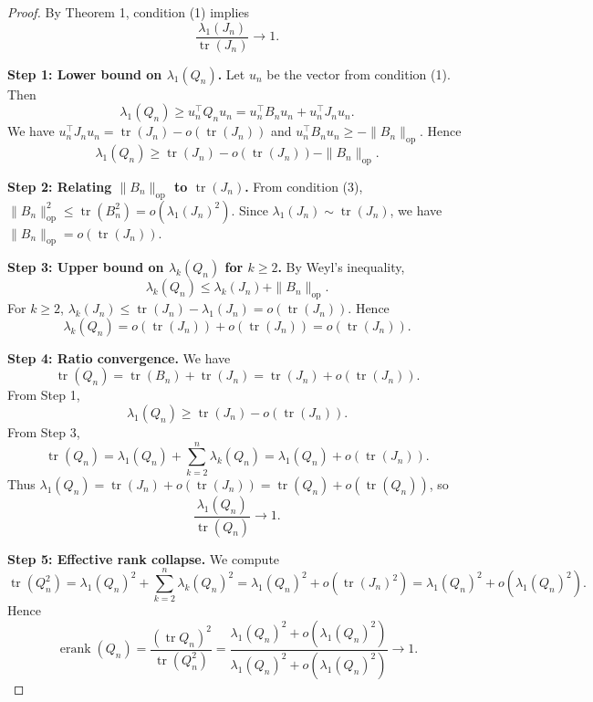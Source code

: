\documentclass{article}
\begin{document}
\begin{proof}
By Theorem 1, condition (1) implies
\[
\frac{\lambda_1(J_n)}{\operatorname{tr}(J_n)} \to 1.
\]

\textbf{Step 1: Lower bound on \(\lambda_1(Q_n)\).}
Let \(u_n\) be the vector from condition (1). Then
\[
\lambda_1(Q_n) \ge u_n^\top Q_n u_n = u_n^\top B_n u_n + u_n^\top J_n u_n.
\]
We have \(u_n^\top J_n u_n = \operatorname{tr}(J_n) - o(\operatorname{tr}(J_n))\) and \(u_n^\top B_n u_n \ge -\|B_n\|_{\mathrm{op}}\). Hence
\[
\lambda_1(Q_n) \ge \operatorname{tr}(J_n) - o(\operatorname{tr}(J_n)) - \|B_n\|_{\mathrm{op}}.
\]

\textbf{Step 2: Relating \(\|B_n\|_{\mathrm{op}}\) to \(\operatorname{tr}(J_n)\).}
From condition (3), \(\|B_n\|_{\mathrm{op}}^2 \le \operatorname{tr}(B_n^2) = o(\lambda_1(J_n)^2)\). Since \(\lambda_1(J_n) \sim \operatorname{tr}(J_n)\), we have \(\|B_n\|_{\mathrm{op}} = o(\operatorname{tr}(J_n))\).

\textbf{Step 3: Upper bound on \(\lambda_k(Q_n)\) for \(k \ge 2\).}
By Weyl's inequality,
\[
\lambda_k(Q_n) \le \lambda_k(J_n) + \|B_n\|_{\mathrm{op}}.
\]
For \(k \ge 2\), \(\lambda_k(J_n) \le \operatorname{tr}(J_n) - \lambda_1(J_n) = o(\operatorname{tr}(J_n))\). Hence
\[
\lambda_k(Q_n) = o(\operatorname{tr}(J_n)) + o(\operatorname{tr}(J_n)) = o(\operatorname{tr}(J_n)).
\]

\textbf{Step 4: Ratio convergence.}
We have
\[
\operatorname{tr}(Q_n) = \operatorname{tr}(B_n) + \operatorname{tr}(J_n) = \operatorname{tr}(J_n) + o(\operatorname{tr}(J_n)).
\]
From Step 1,
\[
\lambda_1(Q_n) \ge \operatorname{tr}(J_n) - o(\operatorname{tr}(J_n)).
\]
From Step 3,
\[
\operatorname{tr}(Q_n) = \lambda_1(Q_n) + \sum_{k=2}^n \lambda_k(Q_n) = \lambda_1(Q_n) + o(\operatorname{tr}(J_n)).
\]
Thus \(\lambda_1(Q_n) = \operatorname{tr}(J_n) + o(\operatorname{tr}(J_n)) = \operatorname{tr}(Q_n) + o(\operatorname{tr}(Q_n))\), so
\[
\frac{\lambda_1(Q_n)}{\operatorname{tr}(Q_n)} \to 1.
\]

\textbf{Step 5: Effective rank collapse.}
We compute
\[
\operatorname{tr}(Q_n^2) = \lambda_1(Q_n)^2 + \sum_{k=2}^n \lambda_k(Q_n)^2 = \lambda_1(Q_n)^2 + o(\operatorname{tr}(J_n)^2) = \lambda_1(Q_n)^2 + o(\lambda_1(Q_n)^2).
\]
Hence
\[
\operatorname{erank}(Q_n) = \frac{(\operatorname{tr} Q_n)^2}{\operatorname{tr}(Q_n^2)} = \frac{\lambda_1(Q_n)^2 + o(\lambda_1(Q_n)^2)}{\lambda_1(Q_n)^2 + o(\lambda_1(Q_n)^2)} \to 1.
\]

\end{proof}
\end{document}
